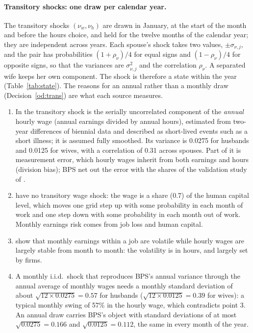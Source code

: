 \documentclass[11pt]{article}
\newcommand{\1}{\mathbf{1}}
\begin{document}
\paragraph{Transitory shocks: one draw per calendar year.} The transitory shocks $(\nu_w, \nu_h)$ are drawn in January,
at the start of the month and before the hours choice, and held for the twelve months of the calendar year; they are
independent across years. Each spouse's shock takes two values, $\pm\sigma_{\nu,j}$, and the pair has probabilities
$(1+\rho_\nu)/4$ for equal signs and $(1-\rho_\nu)/4$ for opposite signs, so that the variances are $\sigma_{\nu,j}^2$
and the correlation $\rho_\nu$. A separated wife keeps her own component. The shock is therefore a state within the year
(Table~\ref{tab:state}). The reasons for an annual rather than a monthly draw (Decision~\ref{od:trans}) are what each
source measures.
\begin{enumerate}
  \item In \citet{blundell2016consumption} the transitory shock is the serially uncorrelated component of the
  \emph{annual} hourly wage (annual earnings divided by annual hours), estimated from two-year differences of biennial
  data and described as short-lived events such as a short illness; it is assumed fully smoothed. Its variance is 0.0275
  for husbands and 0.0125 for wives, with a correlation of 0.31 across spouses. Part of it is measurement error, which
  hourly wages inherit from both earnings and hours (division bias); BPS net out the error with the shares of the
  validation study of \citet{bound1994evidence}.
  \item \citet{bacher2025joint} have no transitory wage shock: the wage is a share (0.7) of the human capital level,
  which moves one grid step up with some probability in each month of work and one step down with some probability in
  each month out of work. Monthly earnings risk comes from job loss and human capital.
  \item \citet{ganong2026earnings} show that monthly earnings within a job are volatile while hourly wages are largely
  stable from month to month: the volatility is in hours, and largely set by firms.
  \item A monthly i.i.d.\ shock that reproduces BPS's annual variance through the annual average of monthly wages needs
  a monthly standard deviation of about $\sqrt{12 \times 0.0275} = 0.57$ for husbands ($\sqrt{12 \times 0.0125} = 0.39$
  for wives): a typical monthly swing of 57\% in the hourly wage, which contradicts point 3. An annual draw carries BPS's
  object with standard deviations of at most $\sqrt{0.0275} = 0.166$ and $\sqrt{0.0125} = 0.112$, the same in every month
  of the year.
\end{enumerate}
\end{document}
